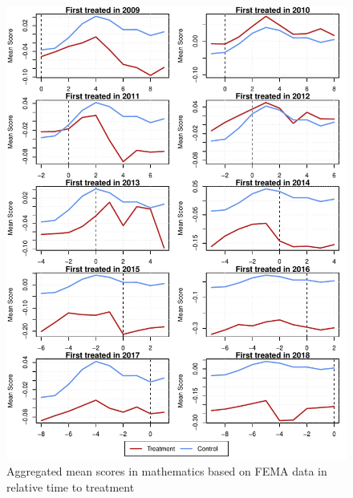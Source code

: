 \begin{figure}[!h]
	\centering
	\includegraphics[scale=1]{"../Code & Data/ParTrendsPlotMathematicsFEMA.pdf"}
	\caption{Aggregated mean scores in mathematics based on FEMA data in relative time to treatment}
	\label{PreTrendsMath}
\end{figure}

